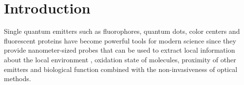 

\section{Introduction\label{sec:intro}}

%
%
%
%

Single quantum emitters such as fluorophores, quantum dots, color centers and fluorescent proteins have become powerful tools
for modern science since they provide nanometer-sized probes that can be used to extract local information about the 
local environment \cite{moerner1999illuminating, kulzer2010single}, oxidation state of molecules\cite{zhang2017gold}, 
proximity of other emitters \cite{stein2011single} and biological function\cite{} combined with the non-invasiveness of optical methods. 

